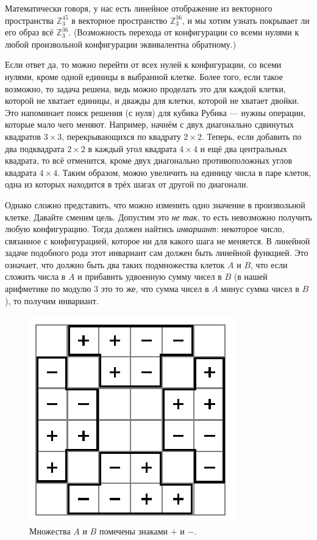 Математически говоря, у нас есть линейное отображение из векторного пространства $\mathbb{Z}_3^{45}$ в векторное пространство $\mathbb{Z}_3^{36}$, и мы хотим узнать покрывает ли его образ всё $\mathbb{Z}_3^{36}$.
(Возможность перехода от конфигурации со всеми нулями к любой произвольной конфигурации эквивалентна обратному.)

Если ответ да, то можно перейти от всех нулей к конфигурации, со всеми нулями, кроме одной единицы в выбранной клетке.
Более того, если такое возможно, то задача решена, ведь можно проделать это для каждой клетки, которой не хватает единицы, и дважды для клетки, которой не хватает двойки.
Это напоминает поиск решения (с нуля) для кубика Рубика --- нужны операции, которые мало чего меняют.
Например, начнём с двух диагонально сдвинутых квадратов $3 \times 3$, перекрывающихся по квадрату $2 \times 2$.
Теперь, если добавить по два подквадрата $2 \times 2$ в каждый угол квадрата $4 \times 4$ и ещё два центральных квадрата, то всё отменится, кроме двух диагонально противоположных углов квадрата $4 \times 4$.
Таким образом, можно увеличить на единицу числа в паре клеток, одна из которых находится в трёх шагах от другой по диагонали.

Однако сложно представить, что можно изменить одно значение в произвольной клетке.
Давайте сменим цель.
Допустим это \emph{не так}, то есть невозможно получить любую конфигурацию.
Тогда должен найтись \emph{инвариант}: некоторое число, связанное с конфигурацией, которое ни для какого шага не меняется.
В линейной задаче подобного рода этот инвариант сам должен быть линейной функцией.
Это означает, что должно быть два таких подмножества клеток $A$ и $B$, что если сложить числа в $A$ и прибавить удвоенную сумму чисел в $B$ (в нашей арифметике по модулю $3$ это то же, что сумма чисел в $A$ минус сумма чисел в $B$), то получим инвариант.

\begin{figure}[t!]
\centering
\includegraphics[scale=1]{pics/chess2}
\caption{Множества $A$ и $B$ помечены знаками $+$ и $-$.}
\label{pic:chess2}
\end{figure}

